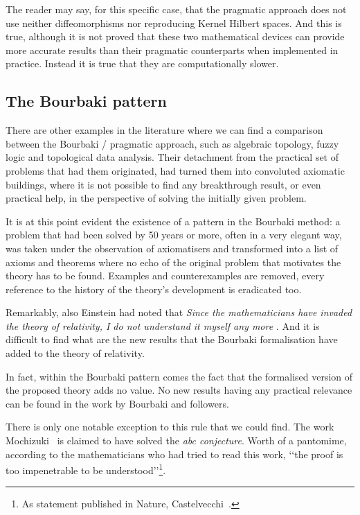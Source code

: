 \documentclass[]{scrartcl}
\theoremstyle{definition}
\begin{document}
The reader may say, for this specific case, that the pragmatic approach \cite{modersitzki2004numerical} does not use neither diffeomorphisms nor reproducing Kernel Hilbert spaces. And this is true, although it is not proved that these two mathematical devices can provide more accurate results than their pragmatic counterparts when implemented in practice. Instead it is true that they are computationally slower.


\subsection*{The Bourbaki pattern} 

There are other examples in the literature where we can find a comparison between the Bourbaki / pragmatic approach, such as algebraic topology, fuzzy logic and topological data analysis. Their detachment from the practical set of problems that had them originated, had turned them into convoluted axiomatic buildings, where it is not possible to find any breakthrough result, or even practical help, in the perspective of solving the initially given problem.

It is at this point evident the existence of a pattern in the Bourbaki method: a problem that had been solved by 50 years or more, often in a very elegant way, was taken under the observation of axiomatisers and transformed into a list of axioms and theorems where no echo of the original problem that motivates the theory has to be found. Examples and counterexamples are removed, every reference to the history of the theory's development is eradicated too.

Remarkably, also Einstein had noted that \emph{Since the mathematicians have invaded the theory of relativity, I do not understand it myself any more} \cite{schilpp1951albert}. And it is difficult to find what are the new results that the Bourbaki formalisation have added to the theory of relativity.

In fact, within the Bourbaki pattern comes the fact that the formalised version of the proposed theory adds no value. No new results having any practical relevance can be found in the work by Bourbaki and followers.

There is only one notable exception to this rule that we could find. The work Mochizuki~\cite{mochizuki2012inter} is claimed to have solved the \emph{abc conjecture}. Worth of a pantomime, according to the mathematicians who had tried to read this work, \lq\lq the proof is too impenetrable to be understood\rq\rq\footnote{As statement published in Nature, Castelvecchi~\cite{castelvecchi2015biggest}.}.
\end{document}

